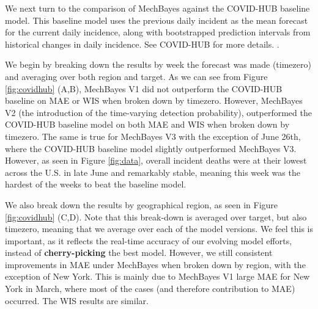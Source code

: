 \documentclass[11pt]{amsart}
\begin{document}
We next turn to the comparison of MechBayes against the COVID-HUB baseline model. This baseline model uses the previous daily incident as the mean forecast for the current daily incidence, along with  bootstrapped prediction intervals from historical changes in daily incidence. See COVID-HUB for more details. \cite{COVID-HUB}. 

We begin by breaking down the results by week the forecast was made (timezero) and averaging over both region and target. As we can see from Figure \ref{fig:covidhub} (A,B), MechBayes V1 did not outperform the COVID-HUB baseline on MAE or WIS when broken down by timezero. However, MechBayes V2 (the introduction of the time-varying detection probability), outperformed the COVID-HUB baseline model on both MAE and WIS when broken down by timezero. The same is true for MechBayes V3 with the exception of June 26th, where the COVID-HUB baseline model slightly outperformed MechBayes V3. However, as seen in Figure \ref{fig:data}, overall incident deaths were at their lowest across the U.S. in late June and remarkably stable, meaning this week was the hardest of the weeks to beat the baseline model. 

We also break down the results by geographical region, as seen in Figure \ref{fig:covidhub} (C,D). Note that this break-down is averaged over target, but also timezero, meaning that we average over each of the model versions. We feel this is important, as it reflects the real-time accuracy of our evolving model efforts, instead of \textbf{cherry-picking} the best model. However, we still consistent improvements in MAE under MechBayes when broken down by region, with the exception of New York. This is mainly due to MechBayes V1 large MAE for New York in March, where most of the cases (and therefore contribution to MAE) occurred. The WIS results are similar. 
\end{document}
